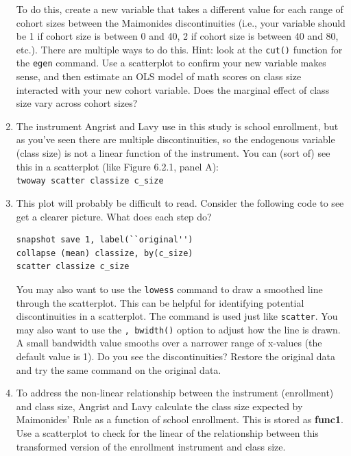 \documentclass[a4paper,12pt]{article}
\begin{document}
\begin{enumerate}
To do this, create a new variable that takes a different value for each range of cohort sizes between the Maimonides discontinuities (i.e., your variable should be 1 if cohort size is between 0 and 40, 2 if cohort size is between 40 and 80, etc.). There are multiple ways to do this. Hint: look at the \texttt{cut()} function for the \texttt{egen} command. Use a scatterplot to confirm your new variable makes sense, and then estimate an OLS model of math scores on class size interacted with your new cohort variable. Does the marginal effect of class size vary across cohort sizes?



\item The instrument Angrist and Lavy use in this study is school enrollment, but as you've seen there are multiple discontinuities, so the endogenous variable (class size) is not a linear function of the instrument. You can (sort of) see this in a scatterplot (like Figure 6.2.1, panel A):\\
\texttt{twoway scatter classize c\_size}

\item This plot will probably be difficult to read. Consider the following code to see get a clearer picture. What does each step do?

\begin{verbatim}
snapshot save 1, label(``original'')
collapse (mean) classize, by(c_size)
scatter classize c_size
\end{verbatim}

You may also want to use the \texttt{lowess} command to draw a smoothed line through the scatterplot. This can be helpful for identifying potential discontinuities in a scatterplot. The command is used just like \texttt{scatter}. You may also want to use the \texttt{, bwidth()} option to adjust how the line is drawn. A small bandwidth value smooths over a narrower range of x-values (the default value is 1). Do you see the discontinuities? Restore the original data and try the same command on the original data.


\item To address the non-linear relationship between the instrument (enrollment) and class size, Angrist and Lavy calculate the class size expected by Maimonides' Rule as a function of school enrollment. This is stored as \textbf{func1}. Use a scatterplot to check for the linear of the relationship between this transformed version of the enrollment instrument and class size.


\end{enumerate}
\end{document}
